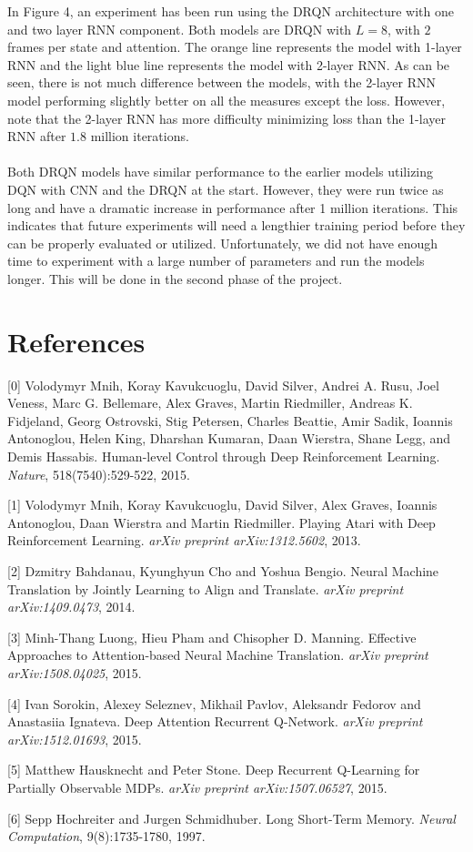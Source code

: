 \documentclass{article}
\begin{document}
In Figure 4, an experiment has been run using the DRQN architecture with one and
two layer RNN component. Both models are DRQN with $L = 8$, with $2$ frames per
state and attention. The orange line represents the model with 1-layer RNN and
the light blue line represents the model with 2-layer RNN. As can be seen, there
is not much difference between the models, with the 2-layer RNN model performing
slightly better on all the measures except the loss. However, note that the
2-layer RNN has more difficulty minimizing loss than the 1-layer RNN after $1.8$
million iterations. \\
\\
Both DRQN models have similar performance to the earlier models utilizing DQN with
CNN and the DRQN at the start. However, they were run twice as long and have a
dramatic increase in performance after 1 million iterations. This indicates that
future experiments will need a lengthier training period before they can be
properly evaluated or utilized. Unfortunately, we did not have enough time to
experiment with a large number of parameters and run the models longer. This will
be done in the second phase of the project.

\section*{References}
\small
[0] Volodymyr Mnih, Koray Kavukcuoglu, David Silver, Andrei A. Rusu, Joel Veness, Marc G. Bellemare, Alex Graves, Martin Riedmiller, Andreas K. Fidjeland, Georg Ostrovski, Stig Petersen, Charles Beattie, Amir Sadik, Ioannis Antonoglou, Helen King, Dharshan Kumaran, Daan Wierstra, Shane Legg, and Demis Hassabis. Human-level Control through Deep Reinforcement Learning. {\it Nature}, 518(7540):529-522, 2015.

[1] Volodymyr Mnih, Koray Kavukcuoglu, David Silver, Alex Graves, Ioannis Antonoglou, Daan Wierstra and Martin Riedmiller. Playing Atari with Deep Reinforcement Learning. {\it arXiv preprint arXiv:1312.5602}, 2013.

[2] Dzmitry Bahdanau, Kyunghyun Cho and Yoshua Bengio. Neural Machine Translation by Jointly Learning to Align and Translate. {\it arXiv preprint arXiv:1409.0473}, 2014.

[3] Minh-Thang Luong, Hieu Pham and Chisopher D. Manning. Effective Approaches to Attention-based Neural Machine Translation. {\it arXiv preprint arXiv:1508.04025}, 2015.

[4] Ivan Sorokin, Alexey Seleznev, Mikhail Pavlov, Aleksandr Fedorov and Anastasiia Ignateva. Deep Attention Recurrent Q-Network. {\it arXiv preprint arXiv:1512.01693}, 2015.

[5] Matthew Hausknecht and Peter Stone. Deep Recurrent Q-Learning for Partially Observable MDPs. {\it arXiv preprint arXiv:1507.06527}, 2015.

[6] Sepp Hochreiter and Jurgen Schmidhuber. Long Short-Term Memory. {\it Neural Computation}, 9(8):1735-1780, 1997.
\end{document}
